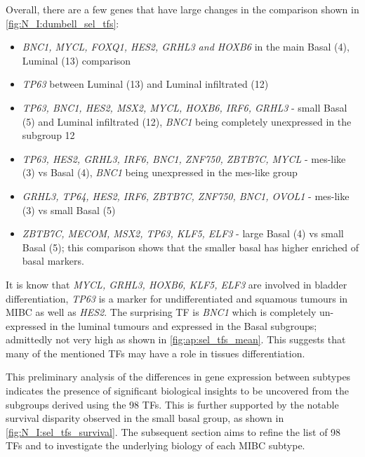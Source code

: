 Overall, there are a few genes that have large changes in the comparison shown in \cref{fig:N_I:dumbell_sel_tfs}: 
\begin{itemize}
    \item \textit{BNC1, MYCL, FOXQ1, HES2, GRHL3 and HOXB6} in the main Basal (4), Luminal (13) comparison
    \item \textit{TP63} between Luminal (13) and Luminal infiltrated (12)
    \item \textit{TP63, BNC1, HES2, MSX2, MYCL, HOXB6, IRF6, GRHL3} - small Basal (5) and Luminal infiltrated (12), \textit{BNC1} being completely unexpressed in the subgroup 12
    \item \textit{TP63, HES2, GRHL3, IRF6, BNC1, ZNF750, ZBTB7C, MYCL} - mes-like (3) vs Basal (4), \textit{BNC1} being unexpressed in the mes-like group
    \item \textit{GRHL3, TP64, HES2, IRF6, ZBTB7C, ZNF750, BNC1, OVOL1} - mes-like (3) vs small Basal (5) 
    \item \textit{ZBTB7C, MECOM, MSX2, TP63, KLF5, ELF3} - large Basal (4) vs small Basal (5); this comparison shows that the smaller basal has higher enriched of basal markers.
\end{itemize}


It is know that \textit{MYCL, GRHL3, HOXB6, KLF5, ELF3} are involved in bladder differentiation, \textit{TP63} is a marker for undifferentiated and squamous tumours in MIBC as well as \textit{HES2}. The surprising TF is \textit{BNC1} which is completely un-expressed in the luminal tumours and expressed in the Basal subgroups; admittedly not very high as shown in \cref{fig:ap:sel_tfs_mean}. This suggests that many of the mentioned TFs may have a role in tissues differentiation.

This preliminary analysis of the differences in gene expression between subtypes indicates the presence of significant biological insights to be uncovered from the subgroups derived using the 98 TFs. This is further supported by the notable survival disparity observed in the small basal group, as shown in \cref{fig:N_I:sel_tfs_survival}. The subsequent section aims to refine the list of 98 TFs and to investigate the underlying biology of each MIBC subtype.

